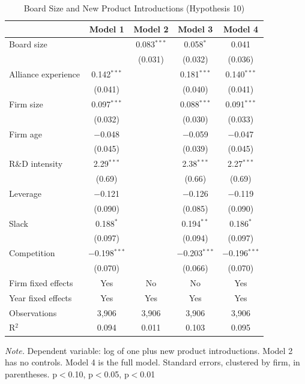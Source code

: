 \documentclass[12pt]{article}
\begin{document}
\begin{table}[p]
\centering\small
\caption{Board Size and New Product Introductions (Hypothesis 10)}
\begin{tabular}{lcccc}
\toprule
 & Model 1 & Model 2 & Model 3 & Model 4 \\
\midrule
Board size &  & 0.083$^{***}$ & 0.058$^{*}$ & 0.041 \\
 &  & (0.031) & (0.032) & (0.036) \\[2pt]
Alliance experience & 0.142$^{***}$ &  & 0.181$^{***}$ & 0.140$^{***}$ \\
 & (0.041) &  & (0.040) & (0.041) \\[2pt]
Firm size & 0.097$^{***}$ &  & 0.088$^{***}$ & 0.091$^{***}$ \\
 & (0.032) &  & (0.030) & (0.033) \\[2pt]
Firm age & $-$0.048 &  & $-$0.059 & $-$0.047 \\
 & (0.045) &  & (0.039) & (0.045) \\[2pt]
R\&D intensity & 2.29$^{***}$ &  & 2.38$^{***}$ & 2.27$^{***}$ \\
 & (0.69) &  & (0.66) & (0.69) \\[2pt]
Leverage & $-$0.121 &  & $-$0.126 & $-$0.119 \\
 & (0.090) &  & (0.085) & (0.090) \\[2pt]
Slack & 0.188$^{*}$ &  & 0.194$^{**}$ & 0.186$^{*}$ \\
 & (0.097) &  & (0.094) & (0.097) \\[2pt]
Competition & $-$0.198$^{***}$ &  & $-$0.203$^{***}$ & $-$0.196$^{***}$ \\
 & (0.070) &  & (0.066) & (0.070) \\[2pt]
\midrule
Firm fixed effects & Yes & No & No & Yes \\
Year fixed effects & Yes & Yes & Yes & Yes \\
Observations & 3,906 & 3,906 & 3,906 & 3,906 \\
R$^2$ & 0.094 & 0.011 & 0.103 & 0.095 \\
\bottomrule
\end{tabular}
\begin{minipage}{0.92\textwidth}\footnotesize\smallskip
\textit{Note.} Dependent variable: log of one plus new product introductions. Model 2 has no controls. Model 4 is the full model. Standard errors, clustered by firm, in parentheses. \textasteriskcentered{} p$<$0.10, \textasteriskcentered{}\textasteriskcentered{} p$<$0.05, \textasteriskcentered{}\textasteriskcentered{}\textasteriskcentered{} p$<$0.01
\end{minipage}
\end{table}
\clearpage
\end{document}
